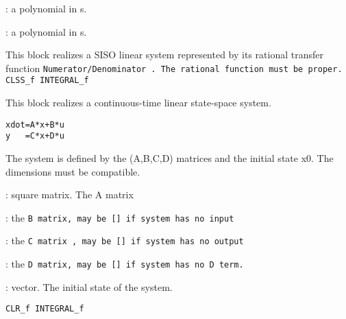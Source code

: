 %
%


\label{CLRf}

\begin{scitem}
\item[{\verb?Numerator?}]
: a polynomial in s.
\item[{\verb?Denominator?}]
: a polynomial in s.
\end{scitem}%
This block realizes a SISO linear system represented by its rational
transfer function %
\tt Numerator/Denominator%
\rm .
The rational function must be proper.
{\verb?CLSS_f INTEGRAL_f?} \pageref{CLSSfINTEGRALf}





%
%


\label{CLSSf}

This block realizes a continuous-time linear state-space system.
\begin{verbatim}
xdot=A*x+B*u
y   =C*x+D*u
\end{verbatim}
The system is defined by the (A,B,C,D) matrices and the initial
state x0. The dimensions must be compatible.
\begin{scitem}
\item[{\verb?A?}]
: square matrix. The A matrix
\item[{\verb?B?}]
: the %
\tt B %
\rm matrix, may be %
\tt [] %
\rm if system has no input
\item[{\verb?C?}]
: the %
\tt C %
\rm matrix , may be %
\tt [] %
\rm if system has no output
\item[{\verb?D?}]
: the %
\tt D %
\rm matrix, may be %
\tt [] %
\rm if system has no %
\tt D %
\rm term.
\item[{\verb?x0?}]
: vector. The initial state of the system.
\end{scitem}%
{\verb?CLR_f INTEGRAL_f ?} \pageref{CLRfINTEGRALf}





%
%


